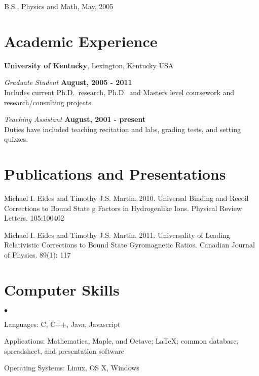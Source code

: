 \documentclass[margin,line]{res}
\newenvironment{list1}{
  \begin{list}{\ding{113}}{%
      \setlength{\itemsep}{0in}
      \setlength{\parsep}{0in} \setlength{\parskip}{0in}
      \setlength{\topsep}{0in} \setlength{\partopsep}{0in} 
      \setlength{\leftmargin}{0.17in}}}{\end{list}}
\newenvironment{list2}{
  \begin{list}{$\bullet$}{%
      \setlength{\itemsep}{0in}
      \setlength{\parsep}{0in} \setlength{\parskip}{0in}
      \setlength{\topsep}{0in} \setlength{\partopsep}{0in} 
      \setlength{\leftmargin}{0.2in}}}{\end{list}}
\begin{document}
\begin{resume}
\begin{list1}
\item[] B.S., Physics and Math,  May, 2005
\end{list1}







%

\section{\sc Academic Experience}
{\bf University of Kentucky}, Lexington, Kentucky USA

\vspace{-.3cm}
{\em Graduate Student} \hfill {\bf August, 2005 - 2011}\\
Includes current Ph.D.~research, Ph.D.~and Masters level coursework and
research/consulting projects.

{\em Teaching Assistant} \hfill {\bf August, 2001  - present}\\
Duties have included teaching recitation and labs, grading tests, and setting quizzes.



\section{\sc Publications and Presentations}
Michael I. Eides and Timothy J.S. Martin.  2010.  Universal Binding and Recoil Corrections to Bound State g Factors in Hydrogenlike Ions.  Physical Review Letters.  105:100402

Michael I. Eides and Timothy J.S. Martin.  2011.  Universality of Leading Relativistic Corrections to Bound State Gyromagnetic Ratios.  Canadian Journal of Physics.  89(1): 117




\section{\sc Computer Skills} 
\begin{list2}
\item Languages:  C, C++, Java, Javascript
\item Applications: Mathematica, Maple, and Octave; \LaTeX; common
  database, spreadsheet, and presentation software
\item 
\item Operating Systems:  Linux, OS X, Windows\\ 
\end{list2}



\end{resume}
\end{document}
